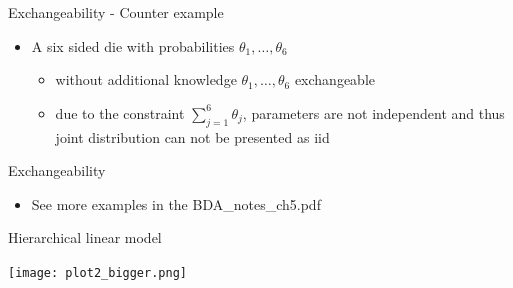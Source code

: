 \documentclass[finnish,english,t]{beamer}
\begin{document}
\begin{frame}{Exchangeability - Counter example}

  \begin{itemize}
  \item A six sided die with probabilities %
    $\theta_1,\ldots,\theta_6$
    \begin{itemize}
    \item without additional knowledge $\theta_1,\ldots,\theta_6$
      exchangeable
    \item due to the constraint $\sum_{j=1}^6\theta_j$, parameters
      are not independent and thus joint distribution can not be
      presented as iid %
    \end{itemize}
  \end{itemize}
\end{frame}

 \begin{frame}

   {\Large\color{navyblue} Exchangeability}

   \begin{itemize}
   \item See more examples in the BDA\_notes\_ch5.pdf
   \end{itemize}

 \end{frame}

\begin{frame}{Hierarchical linear model}

  \centering
  {\texttt{[image: plot2\_bigger.png]}}

\end{frame}
\end{document}

